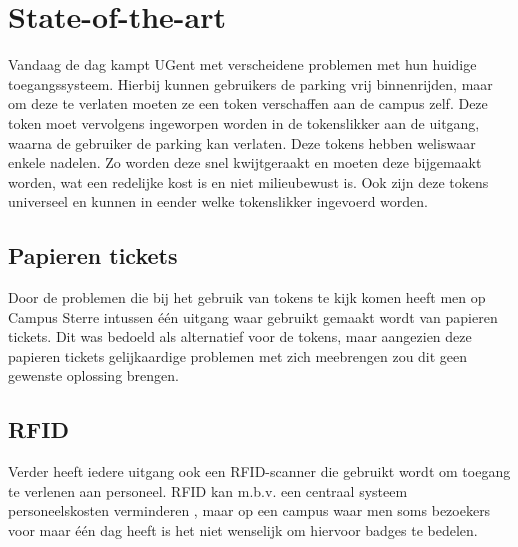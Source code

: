 
\section{State-of-the-art}
\label{sec:state-of-the-art}

Vandaag de dag kampt UGent met verscheidene problemen met hun huidige toegangssysteem. Hierbij kunnen gebruikers de parking vrij binnenrijden, maar om deze te verlaten moeten ze een token verschaffen aan de campus zelf. Deze token moet vervolgens ingeworpen worden in de tokenslikker aan de uitgang, waarna de gebruiker de parking kan verlaten. Deze tokens hebben weliswaar enkele nadelen. Zo worden deze snel kwijtgeraakt en moeten deze bijgemaakt worden, wat een redelijke kost is en niet milieubewust is. Ook zijn deze tokens universeel en kunnen in eender welke tokenslikker ingevoerd worden.
\subsection{Papieren tickets}
Door de problemen die bij het gebruik van tokens te kijk komen heeft men op Campus Sterre intussen één uitgang waar gebruikt gemaakt wordt van papieren tickets. Dit was bedoeld als alternatief voor de tokens, maar aangezien deze papieren tickets gelijkaardige problemen met zich meebrengen zou dit geen gewenste oplossing brengen.
\subsection{RFID}
Verder heeft iedere uitgang ook een RFID-scanner die gebruikt wordt om toegang te verlenen aan personeel. RFID kan m.b.v. een centraal systeem personeelskosten verminderen \autocite{pala2007smart}, maar op een campus waar men soms bezoekers voor maar één dag heeft is het niet wenselijk om hiervoor badges te bedelen.
